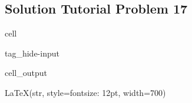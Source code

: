 \documentclass[letterpaper,10pt,english]{jupyterBook}
\begin{document}
\subsection{Solution Tutorial Problem 17}
\label{\detokenize{content/tutorials/T6/tutorial_06:solution-tutorial-problem-17}}
\begin{sphinxuseclass}{cell}
\begin{sphinxuseclass}{tag_hide-input}\begin{sphinxVerbatimOutput}

\begin{sphinxuseclass}{cell_output}
\begin{sphinxVerbatim}[commandchars=\\\{\}]
LaTeX(str, style=\PYGZob{}\PYGZsq{}font\PYGZhy{}size\PYGZsq{}: \PYGZsq{}12pt\PYGZsq{}\PYGZcb{}, width=700)
\end{sphinxVerbatim}

\end{sphinxuseclass}\end{sphinxVerbatimOutput}

\end{sphinxuseclass}
\end{sphinxuseclass}
\end{document}
